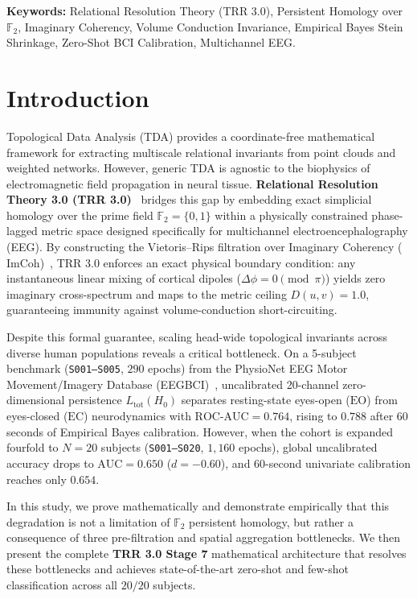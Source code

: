 \documentclass[10pt,twocolumn]{article}
\begin{document}
\textbf{Keywords:} Relational Resolution Theory (TRR 3.0), Persistent Homology over $\mathbb{F}_2$, Imaginary Coherency, Volume Conduction Invariance, Empirical Bayes Stein Shrinkage, Zero-Shot BCI Calibration, Multichannel EEG.

\section{Introduction}

Topological Data Analysis (TDA) provides a coordinate-free mathematical framework for extracting multiscale relational invariants from point clouds and weighted networks. However, generic TDA is agnostic to the biophysics of electromagnetic field propagation in neural tissue. \textbf{Relational Resolution Theory 3.0 (TRR 3.0)}~\cite{weinberg2026trr1} bridges this gap by embedding exact simplicial homology over the prime field $\mathbb{F}_2 = \{0,1\}$ within a physically constrained phase-lagged metric space designed specifically for multichannel electroencephalography (EEG). By constructing the Vietoris--Rips filtration over Imaginary Coherency ($\mathrm{ImCoh}$)~\cite{nolte2004}, TRR 3.0 enforces an exact physical boundary condition: any instantaneous linear mixing of cortical dipoles ($\Delta\phi = 0 \pmod\pi$) yields zero imaginary cross-spectrum and maps to the metric ceiling $D(u,v) = 1.0$, guaranteeing immunity against volume-conduction short-circuiting.

Despite this formal guarantee, scaling head-wide topological invariants across diverse human populations reveals a critical bottleneck. On a 5-subject benchmark (\texttt{S001--S005}, $290$ epochs) from the PhysioNet EEG Motor Movement/Imagery Database (EEGBCI)~\cite{schalk2004}, uncalibrated 20-channel zero-dimensional persistence $L_{\mathrm{tot}}(H_0)$ separates resting-state eyes-open ($\mathrm{EO}$) from eyes-closed ($\mathrm{EC}$) neurodynamics with $\mathrm{ROC\text{-}AUC} = 0.764$, rising to $0.788$ after 60 seconds of Empirical Bayes calibration. However, when the cohort is expanded fourfold to $N=20$ subjects (\texttt{S001--S020}, $1{,}160$ epochs), global uncalibrated accuracy drops to $\mathrm{AUC} = 0.650$ ($d = -0.60$), and 60-second univariate calibration reaches only $0.654$.

In this study, we prove mathematically and demonstrate empirically that this degradation is not a limitation of $\mathbb{F}_2$ persistent homology, but rather a consequence of three pre-filtration and spatial aggregation bottlenecks. We then present the complete \textbf{TRR 3.0 Stage 7} mathematical architecture that resolves these bottlenecks and achieves state-of-the-art zero-shot and few-shot classification across all $20/20$ subjects.
\end{document}
